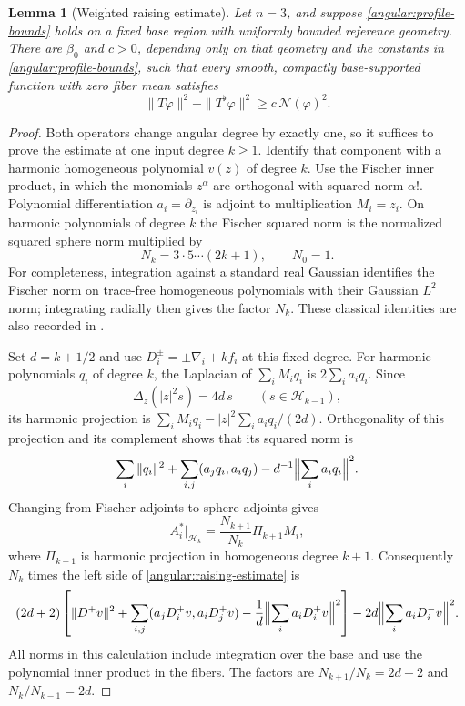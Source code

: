 \documentclass[11pt,a4paper]{article}
\newtheorem{lemma}{Lemma}[section]
\numberwithin{equation}{section}
\begin{document}
\begin{lemma}[Weighted raising estimate]\label{angular:raising}
Let $n=3$, and suppose \eqref{angular:profile-bounds} holds on a fixed
base region with uniformly bounded reference geometry.  There are
$\beta_0$ and $c>0$, depending only on that geometry and the constants in
\eqref{angular:profile-bounds}, such that every smooth, compactly
base-supported function with zero fiber mean satisfies
\begin{equation}\label{angular:raising-estimate}
 \|T\varphi\|^2-\|T^\flat\varphi\|^2
       \ge c\,\mathcal N(\varphi)^2.
\end{equation}
\end{lemma}

\begin{proof}
Both operators change angular degree by exactly one, so it suffices to
prove the estimate at one input degree $k\ge1$.  Identify that component
with a harmonic homogeneous polynomial $v(z)$ of degree $k$.  Use the
Fischer inner product, in which the monomials $z^\alpha$ are orthogonal
with squared norm $\alpha!$.  Polynomial differentiation $a_i=\partial_{z_i}$
is adjoint to multiplication $M_i=z_i$.  On harmonic polynomials of degree
$k$ the Fischer squared norm is the normalized squared sphere norm
multiplied by
\[
 N_k=3\cdot5\cdots(2k+1),\qquad N_0=1.
\]
For completeness, integration against a standard real Gaussian identifies
the Fischer norm on trace-free homogeneous polynomials with their
Gaussian $L^2$ norm;
integrating radially then gives the factor $N_k$.  These classical
identities are also recorded in \cite[Equation~(2.1) and
Theorem~2.1]{Render08}.

Set $d=k+1/2$ and use $D_i^\pm=\pm\nabla_i+k f_i$ at this fixed degree.
For harmonic polynomials $q_i$ of degree $k$, the Laplacian of
$\sum_iM_iq_i$ is $2\sum_i a_iq_i$.  Since
\[
 \Delta_z(|z|^2s)=4d\,s\qquad(s\in\mathcal H_{k-1}),
\]
its harmonic projection is
$\sum_iM_iq_i-|z|^2\sum_i a_iq_i/(2d)$.  Orthogonality of this projection
and its complement shows that its squared norm is
\[
 \sum_i\|q_i\|^2+\sum_{i,j}(a_jq_i,a_iq_j)
             -d^{-1}\Bigl\|\sum_i a_iq_i\Bigr\|^2.
\]
Changing from Fischer adjoints to sphere adjoints gives
\[
 A_i^*|_{\mathcal H_k}
   =\frac{N_{k+1}}{N_k}\Pi_{k+1}M_i,
\]
where $\Pi_{k+1}$ is harmonic projection in homogeneous degree $k+1$.
Consequently $N_k$ times the left side of
\eqref{angular:raising-estimate} is
\begin{equation}\label{angular:Fock-difference}
 \begin{split}
 (2d+2)\left[\|D^+v\|^2
   +\sum_{i,j}(a_jD_i^+v,a_iD_j^+v)
   -\frac1d\Bigl\|\sum_i a_iD_i^+v\Bigr\|^2\right]
 -2d\Bigl\|\sum_i a_iD_i^-v\Bigr\|^2.
 \end{split}
\end{equation}
All norms in this calculation include integration over the base and use
the polynomial inner product in the fibers.  The factors are
$N_{k+1}/N_k=2d+2$ and $N_k/N_{k-1}=2d$.


\end{proof}
\end{document}

